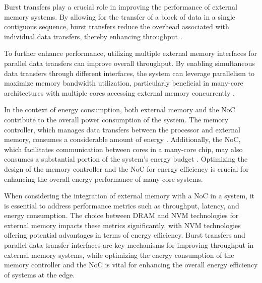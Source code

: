 Burst transfers play a crucial role in improving the performance of external memory systems.
By allowing for the transfer of a block of data in a single contiguous sequence, burst transfers reduce the overhead associated with individual data transfers, thereby enhancing throughput \cite{bakhodaDesigningOnchipNetworks2013}.

To further enhance performance, utilizing multiple external memory interfaces for parallel data transfers can improve overall throughput.
By enabling simultaneous data transfers through different interfaces, the system can leverage parallelism to maximize memory bandwidth utilization, particularly beneficial in many-core architectures with multiple cores accessing external memory concurrently \cite{chenIncreasingOffchipBandwidth2014}.

In the context of energy consumption, both external memory and the NoC contribute to the overall power consumption of the system.
The memory controller, which manages data transfers between the processor and external memory, consumes a considerable amount of energy \cite{udipiRethinkingDRAMDesign2010}.
Additionally, the NoC, which facilitates communication between cores in a many-core chip, may also consumes a substantial portion of the system's energy budget \cite{ziaHighlyscalable3DCLOS2010}.
Optimizing the design of the memory controller and the NoC for energy efficiency is crucial for enhancing the overall energy performance of many-core systems.

When considering the integration of external memory with a NoC in a system, it is essential to address performance metrics such as throughput, latency, and energy consumption.
The choice between DRAM and NVM technologies for external memory impacts these metrics significantly, with NVM technologies offering potential advantages in terms of energy efficiency.
Burst transfers and parallel data transfer interfaces are key mechanisms for improving throughput in external memory systems, while optimizing the energy consumption of the memory controller and the NoC is vital for enhancing the overall energy efficiency of systems at the edge.
